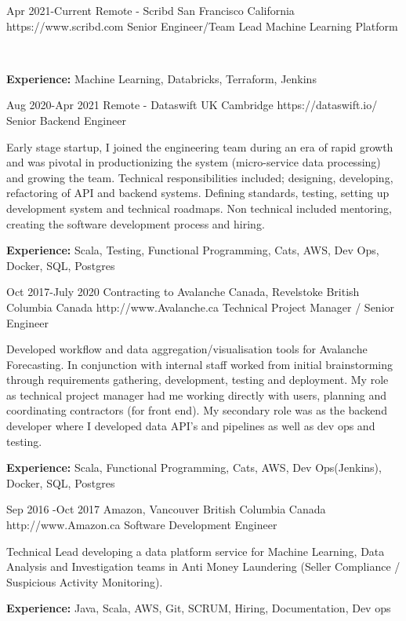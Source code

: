 \documentclass{article}
\begin{document}
\begin{job}
{Apr 2021-}{Current}
{Remote - Scribd San Francisco California}
{https://www.scribd.com}
{Senior Engineer/Team Lead Machine Learning Platform}%
{   \\
\rule{0mm}{5mm}\textbf{Experience:} Machine Learning, Databricks, Terraform, Jenkins}
\end{job}

\begin{job}
{Aug 2020-}{Apr 2021}
{Remote - Dataswift UK Cambridge}
{https://dataswift.io/}
{Senior Backend Engineer}%
{Early stage startup, I joined the engineering team during an era of rapid growth and was pivotal in productionizing the system (micro-service data processing) and growing the team. Technical responsibilities included; designing, developing, refactoring of API and backend systems. Defining standards, testing, setting up development system and technical roadmaps. Non technical included  mentoring, creating the software development process and hiring.  \\
\rule{0mm}{5mm}\textbf{Experience:} Scala, Testing, Functional Programming, Cats, AWS, Dev Ops, Docker, SQL, Postgres}
\end{job}

\begin{job}
{Oct 2017-}{July 2020}
{Contracting to Avalanche Canada, Revelstoke British Columbia Canada}
{http://www.Avalanche.ca}
{Technical Project Manager / Senior Engineer}%
{Developed workflow and data aggregation/visualisation tools for Avalanche Forecasting. In conjunction with internal staff worked from initial brainstorming through requirements gathering, development, testing and deployment. My role as technical project manager had me working directly with users, planning and coordinating contractors (for front end). My secondary role was as the backend developer where I developed data API's and pipelines as well as dev ops and testing.\\
\rule{0mm}{5mm}\textbf{Experience:} Scala, Functional Programming, Cats, AWS, Dev Ops(Jenkins), Docker, SQL, Postgres}
\end{job}

\begin{job}
{Sep 2016 -}{Oct 2017}
{Amazon, Vancouver British Columbia Canada}
{http://www.Amazon.ca}
{Software Development Engineer}%
{Technical Lead developing a data platform service for Machine Learning, Data Analysis and Investigation teams in Anti Money Laundering (Seller Compliance / Suspicious Activity Monitoring). \\
\rule{0mm}{5mm}\textbf{Experience:} Java, Scala, AWS, Git, SCRUM, Hiring, Documentation, Dev ops}
\end{job}
\end{document}
